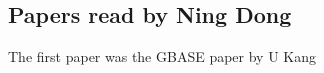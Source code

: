 \documentclass[12pt]{article}
\begin{document}
\newcommand{\beq}{\begin{equation}}
\newcommand{\eeq}{\end{equation}}
\newcommand{\bit}{\begin{itemize*}}
\newcommand{\eit}{\end{itemize*}}
\newcommand{\goal}[1]{ {\noindent {$\Rightarrow$} \em {#1} } }
\newcommand{\hide}[1]{}
\newcommand{\comment}[1]{ {\footnotesize {#1} } }
\newtheorem{lemma}{Lemma}
\newtheorem{theorem}{Theorem}
\newtheorem{proof}{Proof}
\newtheorem{defn}{Definition}
\newtheorem{algo}{Algorithm}
\newtheorem{observation}{Observation}

\subsection{Papers read by Ning Dong}
The first paper was the GBASE paper by U Kang
\cite{Daubechies92Ten}
\end{document}
